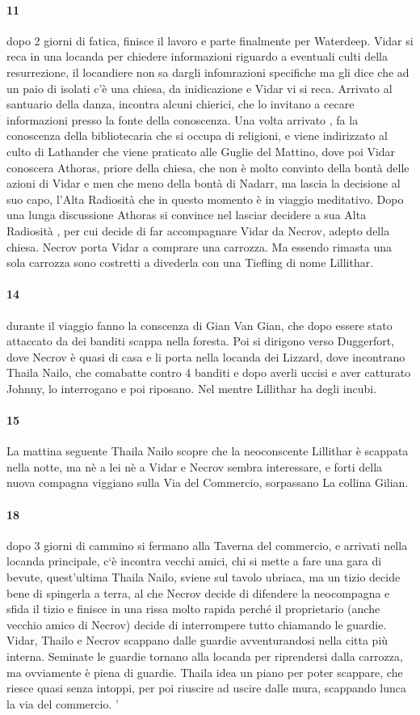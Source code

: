 \documentclass{article}
\begin{document}
      \paragraph{11} dopo 2 giorni di fatica, finisce il lavoro e parte finalmente per Waterdeep. Vidar si reca in una locanda per chiedere informazioni riguardo a eventuali culti della resurrezione, il locandiere non sa dargli infomrazioni specifiche ma gli dice che ad un paio di isolati c'è una chiesa, da inidicazione e Vidar vi si reca. Arrivato al santuario della danza, incontra alcuni chierici, che lo invitano a cecare informazioni presso la fonte della conoscenza. Una volta arrivato , fa la conoscenza della bibliotecaria che si occupa di religioni, e viene indirizzato al culto di Lathander che viene praticato alle Guglie del Mattino, dove poi Vidar conoscera Athoras, priore della chiesa, che non è molto convinto della bontà delle azioni di Vidar e men che meno della bontà di Nadarr, ma lascia la decisione al suo capo, l'Alta Radiosità che in questo momento è in viaggio meditativo. Dopo una lunga discussione Athoras si convince nel lasciar decidere a sua Alta Radiosità , per cui decide di far accompagnare Vidar da Necrov, adepto della chiesa. Necrov porta Vidar a comprare una carrozza. Ma essendo rimasta una sola carrozza sono costretti a divederla con una Tiefling di nome Lillithar. 
      \paragraph{14} durante il viaggio fanno la conscenza di Gian Van Gian, che dopo essere stato attaccato da dei banditi scappa nella foresta. Poi si dirigono verso Duggerfort, dove Necrov è quasi di casa e li porta nella locanda dei Lizzard, dove incontrano Thaila Nailo, che comabatte contro 4 banditi e dopo averli uccisi e aver catturato Johnny, lo interrogano e poi riposano. Nel mentre Lillithar ha degli incubi. 
      \paragraph{15} La mattina seguente Thaila Nailo scopre che la neoconscente Lillithar è scappata nella notte, ma nè a lei nè a Vidar e Necrov sembra interessare, e forti della nuova compagna viggiano sulla  Via del Commercio, sorpassano La collina Gilian.
      \paragraph{18} dopo 3 giorni di cammino si fermano alla Taverna del commercio, e arrivati nella locanda principale, c`è incontra vecchi amici, chi si mette a fare una gara di bevute, quest'ultima Thaila Nailo, sviene sul tavolo ubriaca, ma un tizio decide bene di spingerla a terra, al che Necrov decide di difendere la neocompagna e sfida il tizio e finisce in una rissa molto rapida perché il proprietario (anche vecchio amico di Necrov) decide di interrompere tutto chiamando le guardie. Vidar, Thailo e Necrov scappano dalle guardie avventurandosi nella citta più interna. Seminate le guardie tornano alla locanda per riprendersi dalla carrozza, ma ovviamente è piena di guardie. Thaila idea un piano per poter scappare, che riesce quasi senza intoppi, per poi riuscire ad uscire dalle mura, scappando lunca la via del commercio.  '
\end{document}
